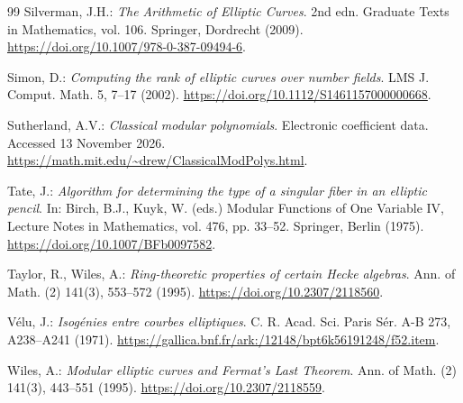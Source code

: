 \documentclass[11pt,a4paper]{article}
\theoremstyle{definition}\newtheorem{definition}[theorem]{Definition}
\theoremstyle{remark}\newtheorem{remark}[theorem]{Remark}
\begin{document}
\begin{thebibliography}{99}
Silverman, J.H.: \emph{The Arithmetic of Elliptic Curves}. 2nd edn. Graduate Texts in Mathematics, vol. 106. Springer, Dordrecht (2009). \url{https://doi.org/10.1007/978-0-387-09494-6}.

Simon, D.: \emph{Computing the rank of elliptic curves over number fields}. LMS J. Comput. Math. 5, 7--17 (2002). \url{https://doi.org/10.1112/S1461157000000668}.

Sutherland, A.V.: \emph{Classical modular polynomials}. Electronic coefficient data. Accessed 13 November 2026. \url{https://math.mit.edu/~drew/ClassicalModPolys.html}.

Tate, J.: \emph{Algorithm for determining the type of a singular fiber in an elliptic pencil}. In: Birch, B.J., Kuyk, W. (eds.) Modular Functions of One Variable IV, Lecture Notes in Mathematics, vol. 476, pp. 33--52. Springer, Berlin (1975). \url{https://doi.org/10.1007/BFb0097582}.

Taylor, R., Wiles, A.: \emph{Ring-theoretic properties of certain Hecke algebras}. Ann. of Math. (2) 141(3), 553--572 (1995). \url{https://doi.org/10.2307/2118560}.

V\'elu, J.: \emph{Isog\'enies entre courbes elliptiques}. C. R. Acad. Sci. Paris Sér. A-B 273, A238--A241 (1971). \url{https://gallica.bnf.fr/ark:/12148/bpt6k56191248/f52.item}.

Wiles, A.: \emph{Modular elliptic curves and Fermat's Last Theorem}. Ann. of Math. (2) 141(3), 443--551 (1995). \url{https://doi.org/10.2307/2118559}.
\end{thebibliography}

\end{document}
